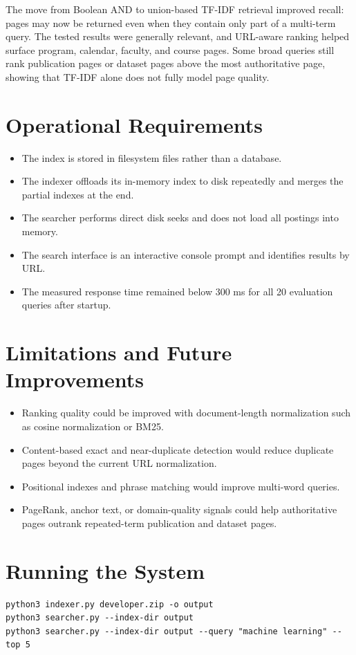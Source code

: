 \documentclass[11pt]{article}
\begin{document}
The move from Boolean AND to union-based TF-IDF retrieval improved recall:
pages may now be returned even when they contain only part of a multi-term
query. The tested results were generally relevant, and URL-aware ranking helped
surface program, calendar, faculty, and course pages. Some broad queries still
rank publication pages or dataset pages above the most authoritative page,
showing that TF-IDF alone does not fully model page quality.

\section{Operational Requirements}

\begin{itemize}
  \item The index is stored in filesystem files rather than a database.
  \item The indexer offloads its in-memory index to disk repeatedly and merges
  the partial indexes at the end.
  \item The searcher performs direct disk seeks and does not load all postings
  into memory.
  \item The search interface is an interactive console prompt and identifies
  results by URL.
  \item The measured response time remained below 300 ms for all 20 evaluation
  queries after startup.
\end{itemize}

\section{Limitations and Future Improvements}

\begin{itemize}
  \item Ranking quality could be improved with document-length normalization
  such as cosine normalization or BM25.
  \item Content-based exact and near-duplicate detection would reduce duplicate
  pages beyond the current URL normalization.
  \item Positional indexes and phrase matching would improve multi-word queries.
  \item PageRank, anchor text, or domain-quality signals could help authoritative
  pages outrank repeated-term publication and dataset pages.
\end{itemize}

\section{Running the System}

\begin{verbatim}
python3 indexer.py developer.zip -o output
python3 searcher.py --index-dir output
python3 searcher.py --index-dir output --query "machine learning" --top 5
\end{verbatim}
\end{document}
